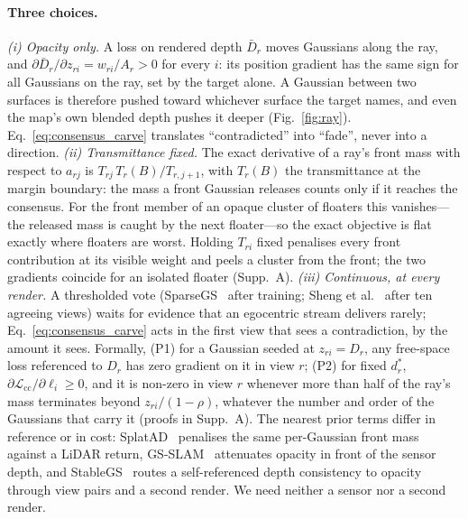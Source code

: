\paragraph{Three choices.}
\emph{(i) Opacity only.} A loss on rendered depth $\bar D_r$ moves Gaussians along the ray, and
$\partial\bar D_r/\partial z_{ri}=w_{ri}/A_r>0$ for every $i$: its position gradient has the same sign for all Gaussians on the ray, set
by the target alone. A Gaussian between two surfaces is therefore pushed toward whichever surface the target names, and even the map's
own blended depth pushes it deeper (Fig.~\ref{fig:ray}). Eq.~\eqref{eq:consensus_carve} translates ``contradicted'' into ``fade'', never
into a direction.
\emph{(ii) Transmittance fixed.} The exact derivative of a ray's front mass with respect to $a_{rj}$ is
$T_{rj}\,T_r(B)/T_{r,j+1}$, with $T_r(B)$ the transmittance at the margin boundary: the mass a front Gaussian releases counts only if it
reaches the consensus. For the front member of an opaque cluster of floaters this vanishes---the released mass is caught by the next
floater---so the exact objective is flat exactly where floaters are worst. Holding $T_{ri}$ fixed penalises every front contribution at
its visible weight and peels a cluster from the front; the two gradients coincide for an isolated floater (Supp.~A).
\emph{(iii) Continuous, at every render.} A thresholded vote (SparseGS~\cite{sparsegs} after training; Sheng et al.~\cite{sheng2026} after
ten agreeing views) waits for evidence that an egocentric stream delivers rarely; Eq.~\eqref{eq:consensus_carve} acts in the first view
that sees a contradiction, by the amount it sees.
Formally, (P1) for a Gaussian seeded at $z_{ri}=D_r$, any free-space loss referenced to $D_r$ has zero gradient on it in view $r$;
(P2) for fixed $d^*_r$, $\partial\mathcal L_{\mathrm{cc}}/\partial\ell_i\ge0$, and it is non-zero in view $r$ whenever more than half of
the ray's mass terminates beyond $z_{ri}/(1-\rho)$, whatever the number and order of the Gaussians that carry it (proofs in Supp.~A).
The nearest prior terms differ in reference or in cost: SplatAD~\cite{splatad} penalises the same per-Gaussian front mass against a LiDAR
return, GS-SLAM~\cite{gsslam} attenuates opacity in front of the sensor depth, and StableGS~\cite{stablegs} routes a self-referenced depth
consistency to opacity through view pairs and a second render. We need neither a sensor nor a second render.


